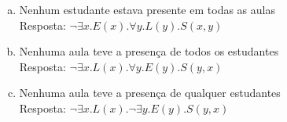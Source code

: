 \documentclass[aspectratio=43]{beamer}
\begin{document}
\begin{frame}
	\begin{enumerate}[d)]
		\item Nenhum estudante estava presente em todas as aulas \\
		\pause
		Resposta: $\neg\exists x.E(x).\forall y.L(y).S(x, y)$ \\
		\pause
		
		\item Nenhuma aula teve a presen\c ca de todos os estudantes \\
		\pause
		Resposta:  $\neg\exists x.L(x).\forall y.E(y).S(y, x)$
		\pause
		
		\item Nenhuma aula teve a presen\c ca de qualquer estudantes \\
		\pause
		Resposta:  $\neg\exists x.L(x).\neg\exists y.E(y).S(y, x)$
	\end{enumerate}
\end{frame}
	
\end{document}
